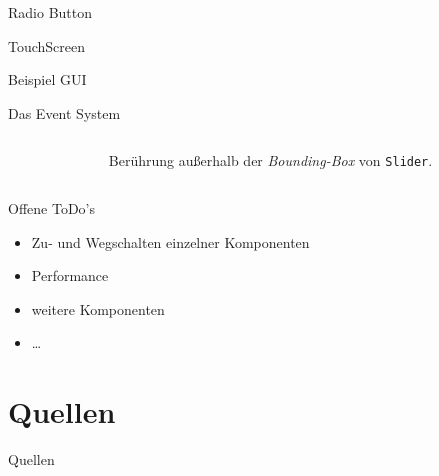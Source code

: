 \documentclass[12pt, aspectratio=169]{beamer}
\begin{document}
	\begin{frame}{Radio Button}
		\centering
	\end{frame}

	\begin{frame}{TouchScreen}
		\centering\scalebox{0.8}{
			\begin{tikzpicture}
				
			\end{tikzpicture}
		}
	\end{frame}

	\begin{frame}{Beispiel GUI}
		\centering
	\end{frame}

	\begin{frame}{Das Event System}
		\begin{columns}
			\begin{column}{0.6\textwidth}
				
			\end{column}
			\begin{column}{0.4\textwidth}
				\pause
				Berührung außerhalb der \emph{Bounding-Box} von \texttt{Slider}.
			\end{column}
		\end{columns}
	\end{frame}
	
	\begin{frame}{Offene ToDo's}
		\begin{itemize}
			\item Zu- und Wegschalten einzelner Komponenten
			\item Performance
			\item weitere Komponenten
			\item \dots
		\end{itemize}
	\end{frame}
	
	\section{Quellen}
	\begin{frame}{Quellen}
		\nocite{ts-holzinger}
		\nocite{I2C-spec_userManual}
		\nocite{stm32_refManual}
		\printbibliography
	\end{frame}
\end{document}
